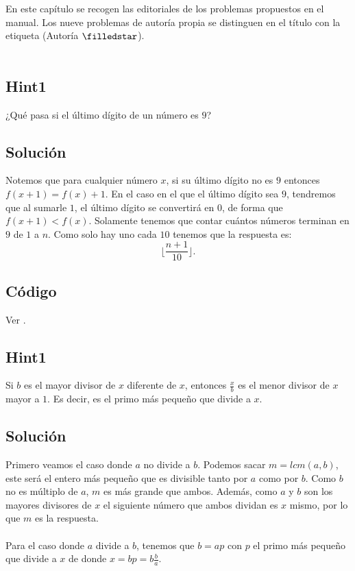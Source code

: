 En este capítulo se recogen las editoriales de los problemas propuestos en el manual. Los nueve problemas de autoría propia se distinguen en el título con la etiqueta (Autoría $\filledstar$).
\\\\

\subsection*{Hint1}
¿Qué pasa si el último dígito de un número es $9$?
\subsection*{Solución}
Notemos que para cualquier número $x$, si su último dígito no es $9$ entonces $f(x+1)=f(x)+1$. En el caso en el que el último dígito sea $9$, tendremos que al sumarle $1$, el último dígito se convertirá en $0$, de forma que $f(x+1)< f(x)$. Solamente tenemos que contar cuántos números terminan en $9$ de $1$ a $n$. Como solo hay uno cada $10$ tenemos que la respuesta es:
\[\lfloor \frac{n+1}{10} \rfloor.\]
\subsection*{Código}
Ver .

\subsection*{Hint1}
Si $b$ es el mayor divisor de $x$ diferente de $x$, entonces $\frac{x}{b}$ es el menor divisor de $x$ mayor a $1$. Es decir, es el primo más pequeño que divide a $x$.
\subsection*{Solución}
Primero veamos el caso donde $a$ no divide a $b$. Podemos sacar $m=lcm(a,b)$, este será el entero más pequeño que es divisible tanto por $a$ como por $b$. Como $b$ no es múltiplo de $a$, $m$ es más grande que ambos. Además, como $a$ y $b$ son los mayores divisores de $x$ el siguiente número que ambos dividan es $x$ mismo, por lo que $m$ es la respuesta.
\\\\Para el caso donde $a$ divide a $b$, tenemos que $b=ap$ con $p$ el primo más pequeño que divide a $x$ de donde $x=bp=b\frac{b}{a}$.
